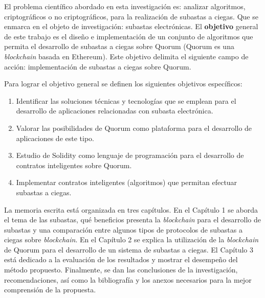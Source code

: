   El problema científico abordado en esta investigación es: analizar algoritmos, criptográficos o no 
  criptográficos, para la 
  realización de subastas a ciegas. Que se enmarca en el objeto de investigación: subastas electrónicas. 
  El \textbf{objetivo} general de 
  este trabajo es el diseño e implementación de un conjunto de algoritmos que permita el desarrollo de 
  subastas a ciegas sobre Quorum 
  (Quorum es una \textit{blockchain} basada en Ethereum). Este objetivo delimita el siguiente campo de 
  acción: implementación de subastas a ciegas sobre Quorum.

  Para lograr el objetivo general se definen los siguientes objetivos específicos:

  \begin{enumerate}
    \item Identificar las soluciones técnicas y tecnologías que se emplean para el desarrollo de aplicaciones relacionadas 
    con subasta electrónica.

    \item Valorar las posibilidades de Quorum como plataforma para el desarrollo de aplicaciones de este tipo.

    \item Estudio de Solidity como lenguaje de programación para el desarrollo de contratos inteligentes sobre Quorum.

    \item Implementar contratos inteligentes (algoritmos) que permitan efectuar subastas a ciegas.

  \end{enumerate}

  La memoria escrita está organizada en tres capítulos.
  En el Capítulo 1 se aborda el tema de las subastas, qué beneficios presenta la \textit{blockchain} para el desarrollo de subastas y 
  una comparación entre algunos tipos de protocolos de subastas a ciegas sobre \textit{blockchain}. En el Capítulo 2 se explica la 
  utilización de la \textit{blockchain} de Quorum para el desarrollo de un sistema de subastas a ciegas. El Capítulo 3 está dedicado a la 
  evaluación de los resultados y mostrar el desempeño del método propuesto. Finalmente, se dan las conclusiones de la investigación, 
  recomendaciones, así como la bibliografía y los anexos necesarios para la mejor comprensión de la propuesta.

